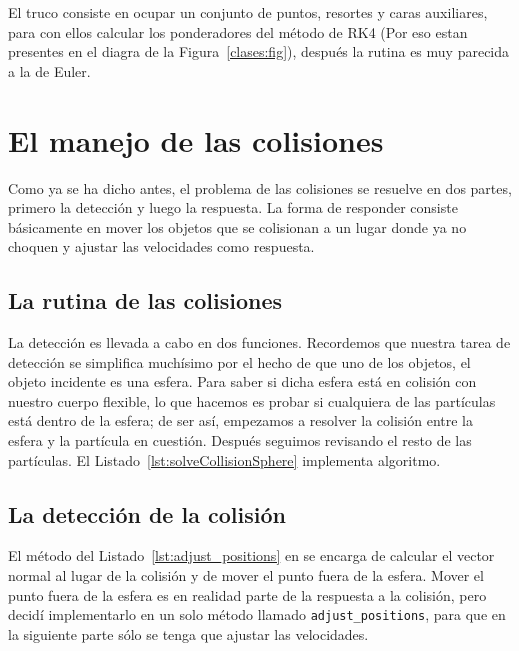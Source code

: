 
El truco consiste en ocupar un conjunto de puntos, resortes y caras auxiliares, para con ellos calcular los ponderadores del método de RK4 (Por eso estan presentes en el diagra de la Figura~\ref{clases:fig}), después la rutina es muy parecida a la de Euler.

\section{El manejo de las colisiones}
Como ya se ha dicho antes, el problema de las colisiones se resuelve en dos partes, primero la detección y luego la respuesta.
La forma de responder consiste básicamente en mover los objetos que se colisionan a un lugar donde ya no choquen y ajustar las velocidades como respuesta.

\subsection{La rutina de las colisiones}
La detección es llevada a cabo en dos funciones.
Recordemos que nuestra tarea de detección se simplifica muchísimo por el hecho de que uno de los objetos, el objeto incidente es una esfera.
Para saber si dicha esfera está en colisión con nuestro cuerpo flexible, lo que hacemos es probar si cualquiera de las partículas está dentro de la esfera; de ser así, empezamos a resolver la colisión entre la esfera y la partícula en cuestión. Después seguimos revisando el resto de las partículas.
El Listado~\ref{lst:solveCollisionSphere} implementa algoritmo.


\subsection{La detección de la colisión}
El método del Listado~\ref{lst:adjust_positions} en se encarga de calcular el vector normal al lugar de la colisión y de mover el punto fuera de la esfera.
Mover el punto fuera de la esfera es en realidad parte de la respuesta a la colisión, pero decidí implementarlo en un solo método llamado \texttt{adjust_positions}, para que en la siguiente parte sólo se tenga que ajustar las velocidades.

